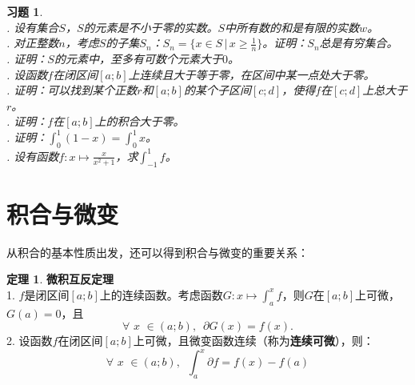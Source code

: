 \documentclass[12pt,UTF8]{ctexbook}
\theoremstyle{definition}
\newtheorem{tm}{定理}[section]
\theoremstyle{plain}
\newtheorem{xt}{习题}[section]
\begin{document}
\begin{xt}
    \mbox{} \\
    . 设有集合$S$，$S$的元素是不小于零的实数。$S$中所有数的和是有限的实数$w$。\\
    . 对正整数$n$，考虑$S$的子集$S_n$：$S_n = \{x\in S \, | \, x \geqslant \frac{1}{n}\}$。证明：$S_n$总是有穷集合。\\
    . 证明：$S$的元素中，至多有可数个元素大于$0$。\\
    . 设函数$f$在闭区间$[a; b]$上连续且大于等于零，在区间中某一点处大于零。\\
    . 证明：可以找到某个正数$r$和$[a; b]$的某个子区间$[c;d]$，使得$f$在$[c;d]$上总大于$r$。\\
    . 证明：$f$在$[a; b]$上的积合大于零。\\
    . 证明：$\int_0^1 (1 - x) = \int_0^1 x$。\\
    . 设有函数$f: x\mapsto \frac{x}{x^2+1}$，求$\int_{-1}^1 f$。\\
\end{xt}

\section{积合与微变}
从积合的基本性质出发，还可以得到积合与微变的重要关系：

\begin{tm}{\textbf{微积互反定理}}
    \mbox{} \\
    1. $f$是闭区间$[a; b]$上的连续函数。考虑函数$G: x\mapsto \int_a^x f$，则$G$在$[a; b]$上可微，
    $G(a) = 0$，且
    $$\forall \,\, x\,\,\in(a; b), \,\,\, \partial G (x) = f(x).$$
    2. 设函数$f$在闭区间$[a; b]$上可微，且微变函数连续（称为\textbf{连续可微}），则：
    $$ \forall \,\, x\,\,\in(a; b), \,\,\, \int_a^x \partial f = f(x) - f(a) $$
\end{tm}
\end{document}

